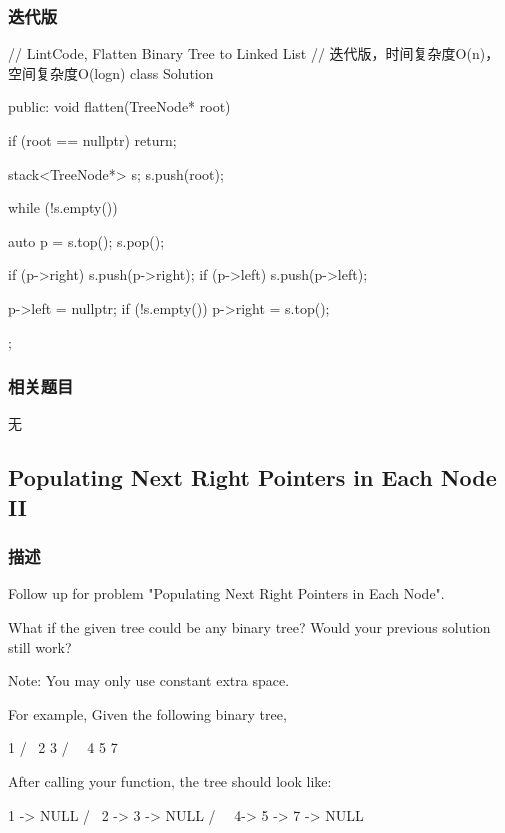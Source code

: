 \subsubsection{迭代版}
\begin{Code}
// LintCode, Flatten Binary Tree to Linked List
// 迭代版，时间复杂度O(n)，空间复杂度O(logn)
class Solution {
public:
    void flatten(TreeNode* root) {
        if (root == nullptr) return;

        stack<TreeNode*> s;
        s.push(root);

        while (!s.empty()) {
            auto p = s.top();
            s.pop();

            if (p->right)
                s.push(p->right);
            if (p->left)
                s.push(p->left);

            p->left = nullptr;
            if (!s.empty())
                p->right = s.top();
        }
    }
};
\end{Code}


\subsubsection{相关题目}
\begindot
\item 无
\myenddot


\subsection{Populating Next Right Pointers in Each Node II} %
\label{sec:populating-next-right-pointers-in-each-node-ii}


\subsubsection{描述}
Follow up for problem "Populating Next Right Pointers in Each Node".

What if the given tree could be any binary tree? Would your previous solution still work?

Note: You may only use constant extra space.

For example,
Given the following binary tree,
\begin{Code}
         1
       /  \
      2    3
     / \    \
    4   5    7
\end{Code}

After calling your function, the tree should look like:
\begin{Code}
         1 -> NULL
       /  \
      2 -> 3 -> NULL
     / \    \
    4-> 5 -> 7 -> NULL
\end{Code}



